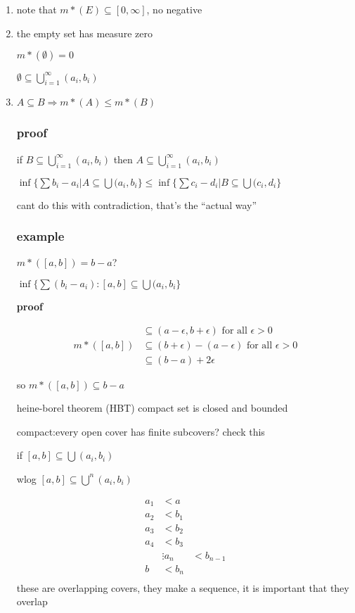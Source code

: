 \documentclass[letterpaper]{article}
\begin{document}
\begin{enumerate}
\item
note that $m*(E)\subseteq[0,\infty]$, no negative 
\item
the empty set has measure zero

$m*(\emptyset)=0$

$\emptyset\subseteq\bigcup_{i=1}^\infty(a_i,b_i)$

\item
$A\subseteq B\Rightarrow m*(A)\le m*(B)$
\subsubsection*{proof}
if $B\subseteq\bigcup_{i=1}^\infty(a_i,b_i)$ then $A\subseteq\bigcup_{i=1}^\infty(a_i,b_i)$

$\inf\{\sum b_i-a_i | A\subseteq\bigcup(a_i,b_i\}\le \inf\{\sum c_i-d_i |B\subseteq \bigcup(c_i,d_i\}$

cant do this with contradiction, that's the ``actual way''
\subsubsection*{example}
$m*([a,b])=b-a$?

$\inf\{\sum(b_i-a_i):[a,b]\subseteq\bigcup(a_i,b_i\}$

{\bfseries proof}

\begin{align*}
  [a,b]&\subseteq(a-\epsilon,b+\epsilon)\text{ for all }\epsilon>0\\
  m*([a,b])&\subseteq(b+\epsilon)-(a-\epsilon)\text{ for all }\epsilon>0\\
  &\subseteq(b-a)+2\epsilon
\end{align*}

so $m*([a,b])\subseteq b-a$

heine-borel theorem (HBT) compact set is closed and bounded

compact:every open cover has finite subcovers? check this

if $[a,b]\subseteq\bigcup(a_i,b_i)$

wlog $[a,b]\subseteq\bigcup^n(a_i,b_i)$

\begin{align*}
  a_1&<a\\
  a_2&<b_1\\
  a_3&<b_2\\
  a_4&<b_3\\
  &\vdots
  a_n&<b_{n-1}\\
  b&<b_n\\
\end{align*}
these are overlapping covers, they make a sequence, it is important that they overlap


\end{enumerate}
\end{document}

